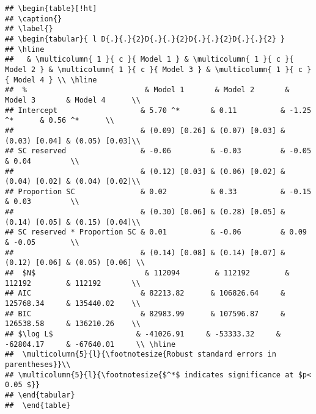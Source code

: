 \documentclass[
]{article}
\begin{document}
\begin{verbatim}
## \begin{table}[!ht]
## \caption{}
## \label{} 
## \begin{tabular}{ l D{.}{.}{2}D{.}{.}{2}D{.}{.}{2}D{.}{.}{2} } 
## \hline 
##   & \multicolumn{ 1 }{ c }{ Model 1 } & \multicolumn{ 1 }{ c }{ Model 2 } & \multicolumn{ 1 }{ c }{ Model 3 } & \multicolumn{ 1 }{ c }{ Model 4 } \\ \hline
##  %                           & Model 1       & Model 2       & Model 3       & Model 4      \\ 
## Intercept                   & 5.70 ^*       & 0.11          & -1.25 ^*      & 0.56 ^*      \\ 
##                             & (0.09) [0.26] & (0.07) [0.03] & (0.03) [0.04] & (0.05) [0.03]\\ 
## SC reserved                 & -0.06         & -0.03         & -0.05         & 0.04         \\ 
##                             & (0.12) [0.03] & (0.06) [0.02] & (0.04) [0.02] & (0.04) [0.02]\\ 
## Proportion SC               & 0.02          & 0.33          & -0.15         & 0.03         \\ 
##                             & (0.30) [0.06] & (0.28) [0.05] & (0.14) [0.05] & (0.15) [0.04]\\ 
## SC reserved * Proportion SC & 0.01          & -0.06         & 0.09          & -0.05        \\ 
##                             & (0.14) [0.08] & (0.14) [0.07] & (0.12) [0.06] & (0.05) [0.06] \\
##  $N$                         & 112094        & 112192        & 112192        & 112192       \\ 
## AIC                         & 82213.82      & 106826.64     & 125768.34     & 135440.02    \\ 
## BIC                         & 82983.99      & 107596.87     & 126538.58     & 136210.26    \\ 
## $\log L$                   & -41026.91     & -53333.32     & -62804.17     & -67640.01     \\ \hline
##  \multicolumn{5}{l}{\footnotesize{Robust standard errors in parentheses}}\\
## \multicolumn{5}{l}{\footnotesize{$^*$ indicates significance at $p< 0.05 $}} 
## \end{tabular} 
##  \end{table}
\end{verbatim}
\end{document}
